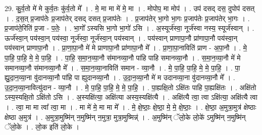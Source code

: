 \documentclass[17pt]{extarticle}
\begin{document}
29. कु॒र्व॒तो मे॑ मे कुर्व॒तः कु॑र्व॒तो मे᳚ । . मे॒ मा मा मे॑ मे॒ मा । . मोपोप॒ मा मोप॑ । . उप॑ दसद् दस॒ दुपोप॑ दसत् । . द॒स॒त् प्र॒जाप॑तेः प्र॒जाप॑तेर् दसद् दसत् प्र॒जाप॑तेः । . प्र॒जाप॑तेर् भा॒गो भा॒गः प्र॒जाप॑तेः प्र॒जाप॑तेर् भा॒गः । . प्र॒जाप॑ते॒रिति॑ प्र॒जा - प॒तेः॒ । . भा॒गो᳚ ऽस्यसि भा॒गो भा॒गो॑ ऽसि । . अ॒स्यूर्ज॑स्वा॒ नूर्ज॑स्वा नस्य॒ स्यूर्ज॑स्वान् । . ऊर्ज॑स्वा॒न् पय॑स्वा॒न् पय॑स्वा॒ नूर्ज॑स्वा॒ नूर्ज॑स्वा॒न् पय॑स्वान् । . पय॑स्वान् प्राणापा॒नौ प्रा॑णापा॒नौ पय॑स्वा॒न् पय॑स्वान् प्राणापा॒नौ । . प्रा॒णा॒पा॒नौ मे॑ मे प्राणापा॒नौ प्रा॑णापा॒नौ मे᳚ । . प्रा॒णा॒पा॒नाविति॑ प्राण - अ॒पा॒नौ । . मे॒ पा॒हि॒ पा॒हि॒ मे॒ मे॒ पा॒हि॒ । . पा॒हि॒ स॒मा॒न॒व्या॒नौ स॑मानव्या॒नौ पा॑हि पाहि समानव्या॒नौ । . स॒मा॒न॒व्या॒नौ मे॑ मे समानव्या॒नौ स॑मानव्या॒नौ मे᳚ । . स॒मा॒न॒व्या॒नाविति॑ समान - व्या॒नौ । . मे॒ पा॒हि॒ पा॒हि॒ मे॒ मे॒ पा॒हि॒ । . पा॒ ह्यु॒दा॒न॒व्या॒ना वु॑दानव्या॒नौ पा॑हि पा ह्युदानव्या॒नौ । . उ॒दा॒न॒व्या॒नौ मे॑ म उदानव्या॒ना वु॑दानव्या॒नौ मे᳚ । . उ॒दा॒न॒व्या॒नावित्यु॑दान - व्या॒नौ । . मे॒ पा॒हि॒ पा॒हि॒ मे॒ मे॒ पा॒हि॒ । . पा॒ह्यक्षि॒तो ऽक्षि॑तः पाहि पा॒ह्यक्षि॑तः । . अक्षि॑तो ऽस्य॒स्यक्षि॒तो ऽक्षि॑तो ऽसि । . अ॒स्यक्षि॑त्या॒ अक्षि॑त्या अस्य॒स्यक्षि॑त्यै । . अक्षि॑त्यै त्वा॒ त्वा ऽक्षि॑त्या॒ अक्षि॑त्यै त्वा । . त्वा॒ मा मा त्वा᳚ त्वा॒ मा । . मा मे॑ मे॒ मा मा मे᳚ । . मे॒ क्षे॒ष्ठाः॒ क्षे॒ष्ठा॒ मे॒ मे॒ क्षे॒ष्ठाः॒ । . क्षे॒ष्ठा॒ अ॒मुत्रा॒मुत्र॑ क्षेष्ठाः क्षेष्ठा अ॒मुत्र॑ । . अ॒मुत्रा॒मुष्मि॑न् न॒मुष्मि॑न् न॒मुत्रा॒ मुत्रा॒मुष्मिन्न्॑ । . अ॒मुष्मि॑न् ॅलो॒के लो॒के॑ ऽमुष्मि॑न् न॒मुष्मि॑न् ॅलो॒के । . लो॒क इति॑ लो॒के । \newline
\end{document}

